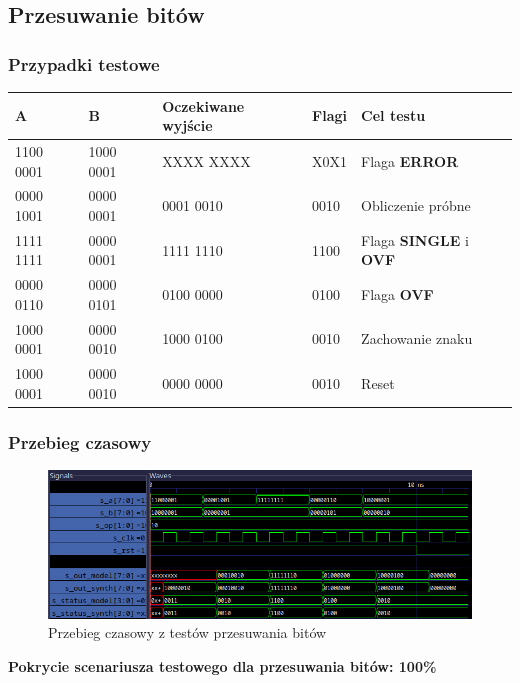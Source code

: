 \documentclass[12pt]{article}
\begin{document}
	\subsection*{Przesuwanie bitów}
	\subsubsection*{Przypadki testowe}
	\begin{table}[H]
		\centering
		\begin{tabular}{|l|l|l|l|l|}
			\hline
			\textbf{A} & \textbf{B} & \textbf{Oczekiwane wyjście} & \textbf{Flagi} & \textbf{Cel testu} \\ \hline
			1100 0001 & 1000 0001 & XXXX XXXX & X0X1 & Flaga \textbf{ERROR} \\ \hline
			0000 1001 & 0000 0001 & 0001 0010 & 0010 & Obliczenie próbne \\ \hline
			1111 1111 & 0000 0001 & 1111 1110 & 1100 & Flaga \textbf{SINGLE} i \textbf{OVF} \\ \hline
			0000 0110 & 0000 0101 & 0100 0000 & 0100 & Flaga \textbf{OVF} \\ \hline
			1000 0001 & 0000 0010 & 1000 0100 & 0010 & Zachowanie znaku \\ \hline
			1000 0001 & 0000 0010 & 0000 0000 & 0010 & Reset \\ \hline
		\end{tabular}
	\end{table}
	\subsubsection*{Przebieg czasowy}
	\begin{figure}[H]
		\begin{center}
			\includegraphics[width=\textwidth]{../Testy/Wyniki_testow/Testy_shl.png}
			\caption*{Przebieg czasowy z testów przesuwania bitów}
			\label{figure:test_shl}
		\end{center}
	\end{figure}
	\vspace{-20pt}
	\textbf{Pokrycie scenariusza testowego dla przesuwania bitów: 100\%}
	
\end{document}
